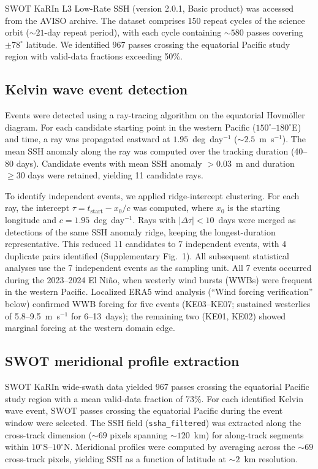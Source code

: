 \documentclass[11pt]{article}
\begin{document}
SWOT KaRIn L3 Low-Rate SSH (version 2.0.1, Basic product) was accessed from the AVISO archive\cite{Morrow2019,FuFerrari2008}. The dataset comprises 150 repeat cycles of the science orbit (${\sim}21$-day repeat period), with each cycle containing ${\sim}580$ passes covering $\pm 78^\circ$ latitude. We identified 967 passes crossing the equatorial Pacific study region with valid-data fractions exceeding 50\%.

\subsection{Kelvin wave event detection}

Events were detected using a ray-tracing algorithm on the equatorial Hovm\"oller diagram. For each candidate starting point in the western Pacific ($150^\circ$--$180^\circ$E) and time, a ray was propagated eastward at $1.95$~deg~day$^{-1}$ (${\sim}2.5$~m~s$^{-1}$). The mean SSH anomaly along the ray was computed over the tracking duration (40--80 days). Candidate events with mean SSH anomaly $> 0.03$~m and duration $\geq 30$ days were retained, yielding 11 candidate rays.

To identify independent events, we applied ridge-intercept clustering. For each ray, the intercept $\tau = t_\mathrm{start} - x_0/c$ was computed, where $x_0$ is the starting longitude and $c = 1.95$~deg~day$^{-1}$. Rays with $|\Delta\tau| < 10$~days were merged as detections of the same SSH anomaly ridge, keeping the longest-duration representative. This reduced 11 candidates to 7 independent events, with 4 duplicate pairs identified (Supplementary Fig.~1). All subsequent statistical analyses use the 7 independent events as the sampling unit. All 7 events occurred during the 2023--2024 El Ni\~no, when westerly wind bursts (WWBs) were frequent in the western Pacific\cite{McPhaden1987}. Localized ERA5 wind analysis (``Wind forcing verification'' below) confirmed WWB forcing for five events (KE03--KE07; sustained westerlies of 5.8--9.5~m~s$^{-1}$ for 6--13~days); the remaining two (KE01, KE02) showed marginal forcing at the western domain edge.

\subsection{SWOT meridional profile extraction}

SWOT KaRIn wide-swath data yielded 967 passes crossing the equatorial Pacific study region with a mean valid-data fraction of 73\%. For each identified Kelvin wave event, SWOT passes crossing the equatorial Pacific during the event window were selected. The SSH field (\texttt{ssha\_filtered}) was extracted along the cross-track dimension (${\sim}69$ pixels spanning ${\sim}120$~km) for along-track segments within $10^\circ$S--$10^\circ$N. Meridional profiles were computed by averaging across the ${\sim}69$ cross-track pixels, yielding SSH as a function of latitude at ${\sim}2$~km resolution.
\end{document}
